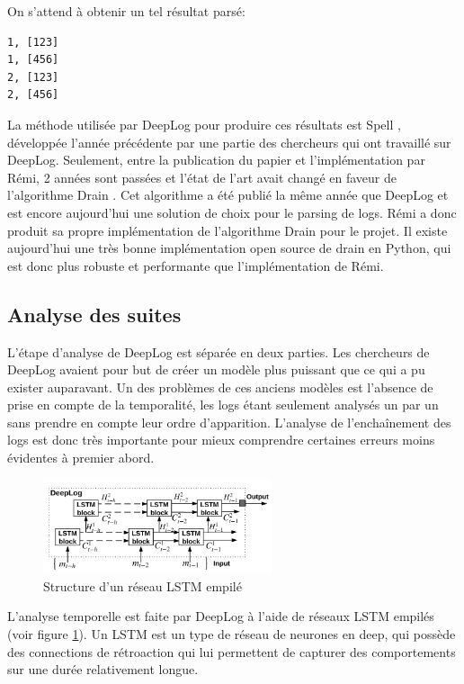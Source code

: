 \documentclass[openany, 11pt]{memoir}
\begin{document}
On s'attend à obtenir un tel résultat parsé:

\begin{lstlisting}
1, [123]
1, [456]
2, [123]
2, [456]
\end{lstlisting}

La méthode utilisée par DeepLog pour produire ces résultats est Spell \cite{spell}, développée l'année précédente par une partie des chercheurs qui ont travaillé sur DeepLog. Seulement, entre la publication du papier et l'implémentation par Rémi, 2 années sont passées et l'état de l'art avait changé en faveur de l'algorithme Drain \cite{drain}. Cet algorithme a été publié la même année que DeepLog et est encore aujourd'hui une solution de choix pour le parsing de \glspl{log}. Rémi a donc produit sa propre implémentation de l'algorithme Drain pour le projet. Il existe aujourd'hui une très bonne implémentation open source de drain en Python, qui est donc plus robuste et performante que l'implémentation de Rémi.

\subsection{Analyse des suites}

L'étape d'analyse de DeepLog est séparée en deux parties. Les chercheurs de DeepLog avaient pour but de créer un modèle plus puissant que ce qui a pu exister auparavant. Un des problèmes de ces anciens modèles est l'absence de prise en compte de la temporalité, les \glspl{log} étant seulement analysés un par un sans prendre en compte leur ordre d'apparition. L'analyse de l'enchaînement des logs est donc très importante pour mieux comprendre certaines erreurs moins évidentes à premier abord.

\begin{figure}[ht]
	\centering
	\includegraphics[width=0.6\textwidth]{images/stacked_lstm.png}
	\caption{Structure d'un réseau LSTM empilé}
	\label{lstm}
\end{figure}

L'analyse temporelle est faite par DeepLog à l'aide de réseaux \gls{LSTM} empilés (voir figure \ref{lstm}). Un \gls{LSTM} est un type de réseau de neurones en \gls{deep}, qui possède des connections de rétroaction qui lui permettent de capturer des comportements sur une durée relativement longue.
\end{document}
